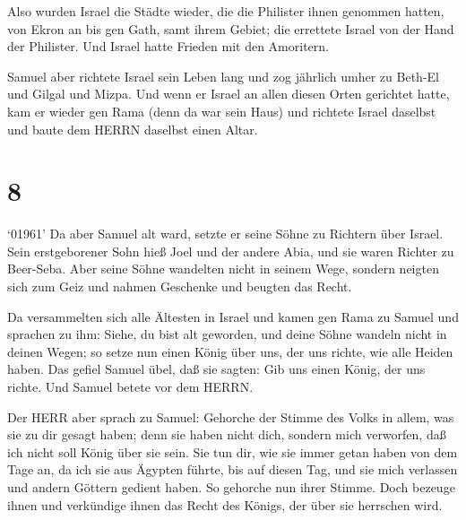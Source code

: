  Also wurden Israel die Städte wieder, die die Philister
ihnen genommen hatten, von Ekron an bis gen Gath, samt ihrem Gebiet; die
errettete Israel von der Hand der Philister. Und Israel hatte Frieden
mit den Amoritern.

 Samuel aber richtete Israel sein Leben lang 
und zog jährlich umher zu Beth-El und Gilgal und Mizpa. Und wenn er
Israel an allen diesen Orten gerichtet hatte,  kam er
wieder gen Rama (denn da war sein Haus) und richtete Israel daselbst und
baute dem HERRN daselbst einen Altar.

\hypertarget{section-7}{%
\section{8}\label{section-7}}

 `01961' Da aber Samuel alt ward, setzte er seine Söhne zu
Richtern über Israel.  Sein erstgeborener Sohn hieß Joel und
der andere Abia, und sie waren Richter zu Beer-Seba.  Aber
seine Söhne wandelten nicht in seinem Wege, sondern neigten sich zum
Geiz und nahmen Geschenke und beugten das Recht.

 Da versammelten sich alle Ältesten in Israel und kamen gen
Rama zu Samuel  und sprachen zu ihm: Siehe, du bist alt
geworden, und deine Söhne wandeln nicht in deinen Wegen; so setze nun
einen König über uns, der uns richte, wie alle Heiden haben.
 Das gefiel Samuel übel, daß sie sagten: Gib uns einen
König, der uns richte. Und Samuel betete vor dem HERRN.

 Der HERR aber sprach zu Samuel: Gehorche der Stimme des
Volks in allem, was sie zu dir gesagt haben; denn sie haben nicht dich,
sondern mich verworfen, daß ich nicht soll König über sie sein.
 Sie tun dir, wie sie immer getan haben von dem Tage an, da
ich sie aus Ägypten führte, bis auf diesen Tag, und sie mich verlassen
und andern Göttern gedient haben.  So gehorche nun ihrer
Stimme. Doch bezeuge ihnen und verkündige ihnen das Recht des Königs,
der über sie herrschen wird.

